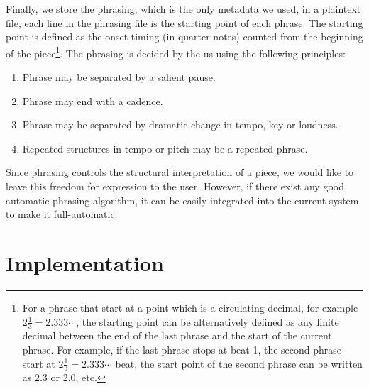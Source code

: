Finally, we store the phrasing, which is the only metadata we used, in a plaintext file, each line in the phrasing file is the starting point of each phrase. The starting point is defined as the onset timing (in quarter notes) counted from the beginning of the piece\footnote{For a phrase that start at a point which is a circulating decimal, for example $2\frac{1}{3}=2.333\cdots$, the starting point can be alternatively defined as any finite decimal between the end of the last phrase and the start of the current phrase. For example, if the last phrase stops at beat 1, the second phrase start at $2\frac{1}{3}=2.333\cdots$ beat, the start point of the second phrase can be written as 2.3 or 2.0, etc.}. The phrasing is decided by the us using the following principles: 
\begin{enumerate}
   \item Phrase may be separated by a salient pause.
   \item Phrase may end with a cadence.
   \item Phrase may be separated by dramatic change in tempo, key or loudness.
   \item Repeated structures in tempo or pitch may be a repeated phrase.
\end{enumerate}

Since phrasing controls the structural interpretation of a piece, we would like to leave this freedom for expression to the user. However, if there exist any good automatic phrasing algorithm, it can be easily integrated into the current system to make it full-automatic.

 
\section{Implementation}


